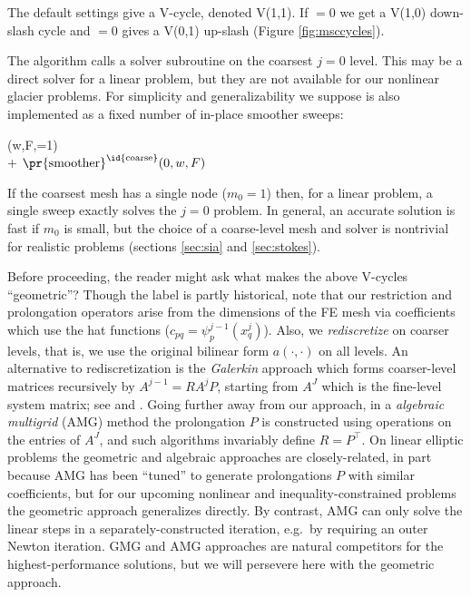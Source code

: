 \documentclass[letterpaper,final,12pt,reqno]{amsart}
\theoremstyle{claim}
\numberwithin{equation}{section}
\numberwithin{figure}{section}
\numberwithin{table}{section}
\numberwithin{theorem}{section}
\begin{document}
The default settings give a V-cycle, denoted V(1,1).  If  $=0$ we get a V(1,0) down-slash cycle and  $=0$ gives a V(0,1) up-slash (Figure \ref{fig:msccycles}).

The algorithm calls a solver subroutine on the coarsest $j=0$ level.  This may be a direct solver for a linear problem, but they are not available for our nonlinear glacier problems.  For simplicity and generalizability we suppose  is also implemented as a fixed number of in-place smoother sweeps:
\begin{pseudo*} \label{ps:gmg-coarsesolve}
(w,F,=1)\text{:} \\+
    $\text{\pr{smoother}}^{\text{\id{coarse}}}(0,w,F)$ \\
\end{pseudo*}
If the coarsest mesh has a single node ($m_0=1$) then, for a linear problem, a single sweep exactly solves the $j=0$ problem.  In general, an accurate solution is fast if $m_0$ is small, but the choice of a coarse-level mesh and solver is nontrivial for realistic problems (sections \ref{sec:sia} and \ref{sec:stokes}).

Before proceeding, the reader might ask what makes the above V-cycles ``geometric''?  Though the label is partly historical, note that our restriction and prolongation operators arise from the dimensions of the FE mesh via coefficients which use the hat functions ($c_{pq} = \psi_p^{j-1}(x_q^j)$).  Also, we \emph{rediscretize} on coarser levels, that is, we use the original bilinear form $a(\cdot,\cdot)$ on all levels.  An alternative to rediscretization is the \emph{Galerkin} approach which forms coarser-level matrices recursively by $A^{j-1} = R A^j P$, starting from $A^J$ which is the fine-level system matrix; see \cite[Chapter V]{Braess2007} and \cite[Chapter 6]{Bueler2021}.  Going further away from our approach, in a \emph{algebraic multigrid} (AMG) method \cite[Appendix A]{Trottenbergetal2001} the prolongation $P$ is constructed using operations on the entries of $A^J$, and such algorithms invariably define $R=P^\top$.  On linear elliptic problems the geometric and algebraic approaches are closely-related, in part because AMG has been ``tuned'' to generate prolongations $P$ with similar coefficients, but for our upcoming nonlinear and inequality-constrained problems the geometric approach generalizes directly.  By contrast, AMG can only solve the linear steps in a separately-constructed iteration, e.g.~by requiring an outer Newton iteration.  GMG and AMG approaches are natural competitors for the highest-performance solutions, but we will persevere here with the geometric approach.
\end{document}
